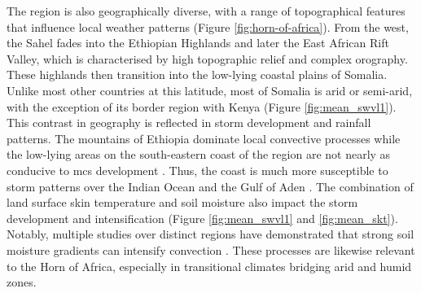 The region is also geographically diverse, with a range of topographical features that influence local weather patterns (Figure \ref{fig:horn-of-africa}). From the west, the Sahel fades into the Ethiopian Highlands and later the East African Rift Valley, which is characterised by high topographic relief and complex orography. These highlands then transition into the low-lying coastal plains of Somalia. Unlike most other countries at this latitude, most of Somalia is arid or semi-arid, with the exception of its border region with Kenya \citep{Beck2023} (Figure \ref{fig:mean_swvl1}). This contrast in geography is reflected in storm development and rainfall patterns. The mountains of Ethiopia dominate local convective processes while the low-lying areas on the south-eastern coast of the region are not nearly as conducive to \acrshort{mcs} development \citep{Negash2024,Camberlin2024}. Thus, the coast is much more susceptible to storm patterns over the Indian Ocean and the Gulf of Aden \citep{Camberlin2024}. The combination of land surface skin temperature and soil moisture also impact the storm development and intensification (Figure \ref{fig:mean_swvl1} and \ref{fig:mean_skt}). Notably, multiple studies over distinct regions have demonstrated that strong soil moisture gradients can intensify convection \citep{Barton2021,Klein2020,Taylor2017}. These processes are likewise relevant to the Horn of Africa, especially in transitional climates bridging arid and humid zones.


